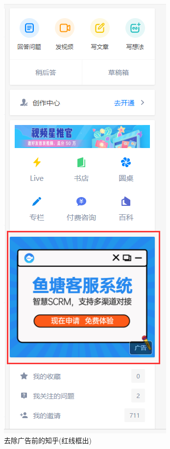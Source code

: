 \documentclass[UTF8]{article}
\begin{document}
\begin{minipage}{\linewidth/2}
\begin{figure}[H]
	\centering
	\includegraphics[width=\linewidth/3*2]{zhihu_ad.png}
	\caption{去除广告前的知乎(红线框出)}
\end{figure}\par
\end{minipage}
\end{document}

